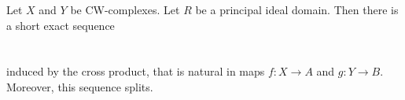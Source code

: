 \documentclass[a4paper]{article}
\begin{document}
\begin{prp}{}{} Let $X$ and $Y$ be CW-complexes. Let $R$ be a principal ideal domain. Then there is a short exact sequence \\~\\
\\
induced by the cross product, that is natural in maps $f:X\to A$ and $g:Y\to B$. Moreover, this sequence splits. 
\end{prp}
\end{document}
